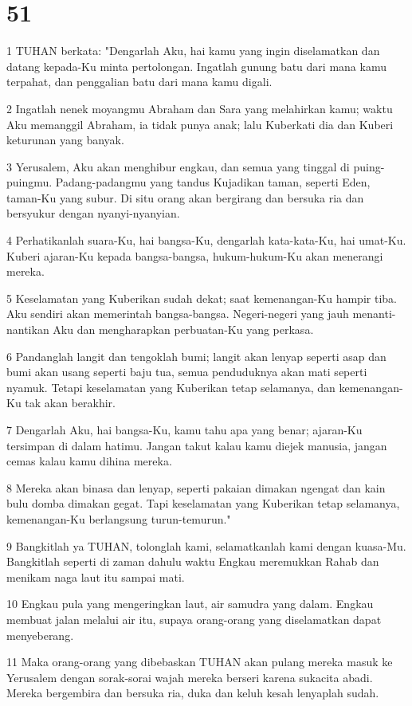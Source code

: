 \chapter{51}

\par 1 TUHAN berkata: "Dengarlah Aku, hai kamu yang ingin diselamatkan dan datang kepada-Ku minta pertolongan. Ingatlah gunung batu dari mana kamu terpahat, dan penggalian batu dari mana kamu digali.
\par 2 Ingatlah nenek moyangmu Abraham dan Sara yang melahirkan kamu; waktu Aku memanggil Abraham, ia tidak punya anak; lalu Kuberkati dia dan Kuberi keturunan yang banyak.
\par 3 Yerusalem, Aku akan menghibur engkau, dan semua yang tinggal di puing-puingmu. Padang-padangmu yang tandus Kujadikan taman, seperti Eden, taman-Ku yang subur. Di situ orang akan bergirang dan bersuka ria dan bersyukur dengan nyanyi-nyanyian.
\par 4 Perhatikanlah suara-Ku, hai bangsa-Ku, dengarlah kata-kata-Ku, hai umat-Ku. Kuberi ajaran-Ku kepada bangsa-bangsa, hukum-hukum-Ku akan menerangi mereka.
\par 5 Keselamatan yang Kuberikan sudah dekat; saat kemenangan-Ku hampir tiba. Aku sendiri akan memerintah bangsa-bangsa. Negeri-negeri yang jauh menanti-nantikan Aku dan mengharapkan perbuatan-Ku yang perkasa.
\par 6 Pandanglah langit dan tengoklah bumi; langit akan lenyap seperti asap dan bumi akan usang seperti baju tua, semua penduduknya akan mati seperti nyamuk. Tetapi keselamatan yang Kuberikan tetap selamanya, dan kemenangan-Ku tak akan berakhir.
\par 7 Dengarlah Aku, hai bangsa-Ku, kamu tahu apa yang benar; ajaran-Ku tersimpan di dalam hatimu. Jangan takut kalau kamu diejek manusia, jangan cemas kalau kamu dihina mereka.
\par 8 Mereka akan binasa dan lenyap, seperti pakaian dimakan ngengat dan kain bulu domba dimakan gegat. Tapi keselamatan yang Kuberikan tetap selamanya, kemenangan-Ku berlangsung turun-temurun."
\par 9 Bangkitlah ya TUHAN, tolonglah kami, selamatkanlah kami dengan kuasa-Mu. Bangkitlah seperti di zaman dahulu waktu Engkau meremukkan Rahab dan menikam naga laut itu sampai mati.
\par 10 Engkau pula yang mengeringkan laut, air samudra yang dalam. Engkau membuat jalan melalui air itu, supaya orang-orang yang diselamatkan dapat menyeberang.
\par 11 Maka orang-orang yang dibebaskan TUHAN akan pulang mereka masuk ke Yerusalem dengan sorak-sorai wajah mereka berseri karena sukacita abadi. Mereka bergembira dan bersuka ria, duka dan keluh kesah lenyaplah sudah.
